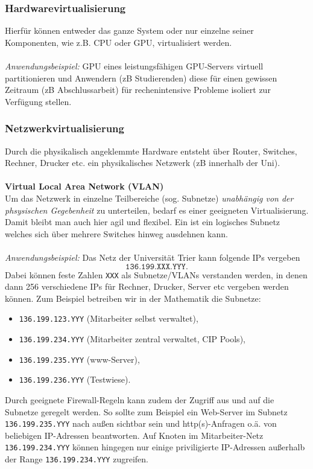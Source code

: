 \subsubsection{Hardwarevirtualisierung}
Hierfür können entweder das ganze System oder nur einzelne seiner Komponenten, wie z.B. CPU oder GPU, virtualisiert werden.\\~\\ \textit{Anwendungsbeispiel:} GPU eines leistungsfähigen GPU-Servers virtuell partitionieren und Anwendern (zB Studierenden) diese für einen gewissen Zeitraum (zB Abschlussarbeit) für rechenintensive Probleme isoliert zur Verfügung stellen.

\subsubsection{Netzwerkvirtualisierung}
Durch die physikalisch angeklemmte Hardware entsteht über Router, Switches, Rechner, Drucker etc. ein physikalisches Netzwerk (zB innerhalb der Uni).\\~\\
\textbf{Virtual Local Area Network (VLAN)}\\
Um das Netzwerk in einzelne Teilbereiche (sog. Subnetze) \textit{unabhängig von der phsysischen Gegebenheit} zu unterteilen, bedarf es einer geeigneten Virtualisierung. Damit bleibt man auch hier agil und flexibel. Ein  ist ein logisches Subnetz welches sich über mehrere Switches hinweg ausdehnen kann.\\~\\
\textit{Anwendungsbeispiel:} Das Netz der Universität Trier kann folgende IPs vergeben $$\texttt{136.199.XXX.YYY}.$$ Dabei können feste Zahlen \texttt{XXX} als Subnetze/VLANs verstanden werden, in denen dann 256 verschiedene IPs für Rechner, Drucker, Server etc vergeben werden können. Zum Beispiel betreiben wir in der Mathematik die Subnetze:
\begin{itemize}
	\item \texttt{136.199.123.YYY} (Mitarbeiter selbst verwaltet),
	\item \texttt{136.199.234.YYY} (Mitarbeiter zentral verwaltet, CIP Pools),
	\item \texttt{136.199.235.YYY} (www-Server),
	\item \texttt{136.199.236.YYY} (Testwiese).
\end{itemize}
Durch geeignete Firewall-Regeln kann zudem der Zugriff aus und auf die Subnetze geregelt werden. So sollte zum Beispiel ein Web-Server im Subnetz \texttt{136.199.235.YYY} nach außen sichtbar sein und http(s)-Anfragen o.ä. von beliebigen IP-Adressen beantworten. Auf Knoten im Mitarbeiter-Netz \texttt{136.199.234.YYY} können hingegen nur einige priviligierte IP-Adressen außerhalb der Range \texttt{136.199.234.YYY} zugreifen.
